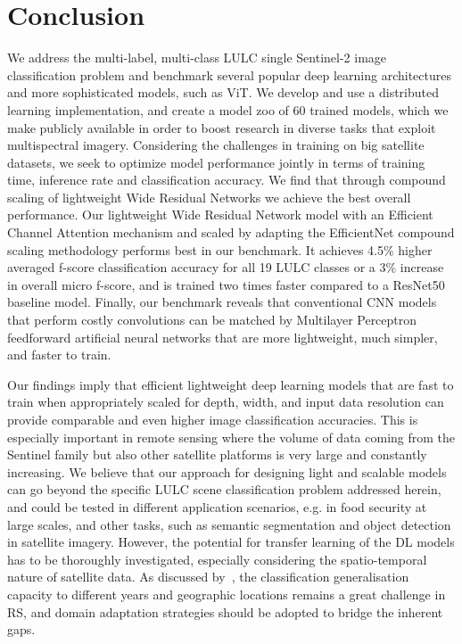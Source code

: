 \documentclass[journal]{IEEEtran}
\begin{document}
\section{Conclusion}
We address the multi-label, multi-class LULC single Sentinel-2 image classification problem and benchmark several popular deep learning architectures and more sophisticated models, such as ViT. We develop and use a distributed learning implementation, and create a model zoo of 60 trained models, which we make publicly available in order to boost research in diverse tasks that exploit multispectral imagery. Considering the challenges in training on big satellite datasets, we seek to optimize model performance jointly in terms of training time, inference rate and classification accuracy. We find that through compound scaling of lightweight Wide Residual Networks we achieve the best overall performance. Our lightweight Wide Residual Network model with an Efficient Channel Attention mechanism and scaled by adapting the EfficientNet compound scaling methodology performs best in our benchmark. It achieves 4.5\% higher averaged f-score classification accuracy for all 19 LULC classes or a 3\% increase in overall micro f-score, and is trained two times faster compared to a ResNet50 baseline model. Finally, our benchmark reveals that conventional CNN models that perform costly convolutions can be matched by Multilayer Perceptron feedforward artificial neural networks that are more lightweight, much simpler, and faster to train. 





Our findings imply that efficient lightweight deep learning models that are fast to train when appropriately scaled for depth, width, and input data resolution can provide comparable and even higher image classification accuracies. This is especially important in remote sensing where the volume of data coming from the Sentinel family but also other satellite platforms is very large and constantly increasing. We believe that our approach for designing light and scalable models can go beyond the specific LULC scene classification problem addressed herein, and could be tested in different application scenarios, e.g. in food security at large scales, and other tasks, such as semantic segmentation and object detection in satellite imagery. 
However, the potential for transfer learning of the DL models has to be thoroughly investigated, especially considering the spatio-temporal nature of satellite data. As discussed by~\cite{sykas2022sentinel}, the classification generalisation capacity to different years and geographic locations remains a great challenge in RS, and domain adaptation strategies should be adopted to bridge the inherent gaps.
\end{document}
